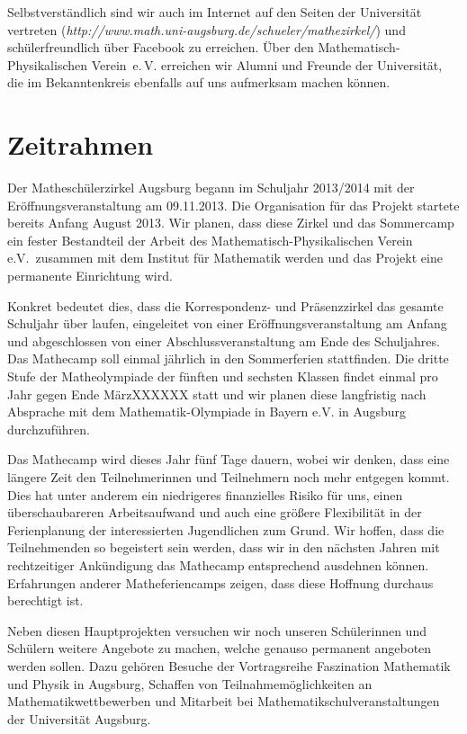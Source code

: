 \documentclass[12pt]{zettel}
\begin{document}
Selbstverständlich sind wir auch im Internet auf den Seiten der Universität
vertreten (\textsl{http:/\!/www.math.uni-augsburg.de/schueler/mathezirkel/})
und schülerfreundlich über Facebook zu erreichen. Über den
Mathematisch-Physikalischen Verein~e.\,V. erreichen wir Alumni und Freunde der
Universität, die im Bekanntenkreis ebenfalls auf uns aufmerksam machen können.


\section{Zeitrahmen}

Der Matheschülerzirkel Augsburg begann im Schuljahr 2013/2014 mit der
Eröffnungsveranstaltung am 09.11.2013. Die Organisation für das Projekt
startete bereits Anfang August 2013. Wir planen, dass diese Zirkel und
das Sommercamp ein fester Bestandteil der Arbeit des
Mathematisch-Physikalischen Verein e.V.\ zusammen mit dem Institut für
Mathematik werden und das Projekt eine permanente Einrichtung wird.

Konkret bedeutet dies, dass die Korrespondenz- und Präsenzzirkel das
gesamte Schuljahr über laufen, eingeleitet von einer
Eröffnungsveranstaltung am Anfang und abgeschlossen von einer
Abschlussveranstaltung am Ende des Schuljahres. Das Mathecamp soll
einmal jährlich in den Sommerferien stattfinden. Die dritte Stufe der
Matheolympiade der fünften und sechsten Klassen findet einmal pro Jahr
gegen Ende MärzXXXXXX statt und wir planen diese langfristig nach
Absprache mit dem Mathematik-Olympiade in Bayern e.V. in Augsburg
durchzuführen.

Das Mathecamp wird dieses Jahr fünf Tage dauern, wobei wir denken, dass
eine längere Zeit den Teilnehmerinnen und Teilnehmern noch mehr entgegen
kommt. Dies hat unter anderem ein niedrigeres finanzielles Risiko für
uns, einen überschaubareren Arbeitsaufwand und auch eine größere
Flexibilität in der Ferienplanung der interessierten Jugendlichen zum
Grund. Wir hoffen, dass die Teilnehmenden so begeistert sein werden,
dass wir in den nächsten Jahren mit rechtzeitiger Ankündigung das
Mathecamp entsprechend ausdehnen können. Erfahrungen anderer
Matheferiencamps zeigen, dass diese Hoffnung durchaus berechtigt ist.

Neben diesen Hauptprojekten versuchen wir noch unseren Schülerinnen und
Schülern weitere Angebote zu machen, welche genauso permanent angeboten
werden sollen. Dazu gehören Besuche der Vortragsreihe Faszination
Mathematik und Physik in Augsburg, Schaffen von Teilnahmemöglichkeiten
an Mathematikwettbewerben und Mitarbeit bei
Mathematikschulveranstaltungen der Universität Augsburg.
\end{document}
